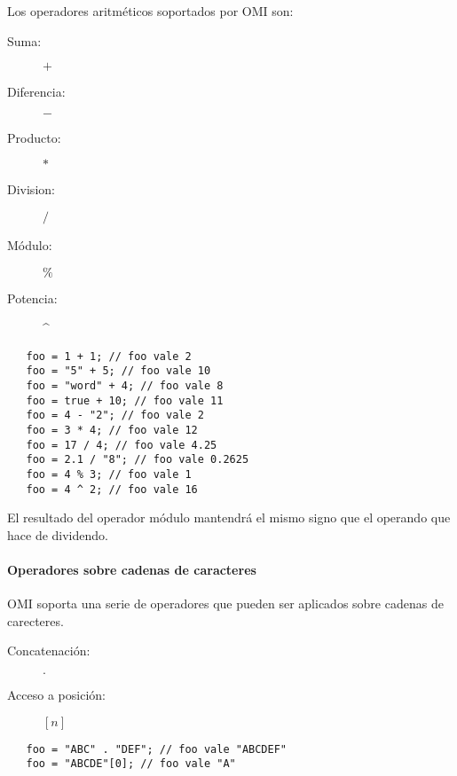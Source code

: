 Los operadores aritméticos soportados por OMI son:

\begin{description}
\item [Suma:] $+$
\item [Diferencia:] $-$
\item [Producto:] $*$
\item [Division:] $/$
\item [Módulo:] $\%$
\item [Potencia:] \^ \hfill   
\end{description} 


\begin{lstlisting}
   foo = 1 + 1; // foo vale 2
   foo = "5" + 5; // foo vale 10
   foo = "word" + 4; // foo vale 8
   foo = true + 10; // foo vale 11
   foo = 4 - "2"; // foo vale 2
   foo = 3 * 4; // foo vale 12
   foo = 17 / 4; // foo vale 4.25
   foo = 2.1 / "8"; // foo vale 0.2625
   foo = 4 % 3; // foo vale 1
   foo = 4 ^ 2; // foo vale 16 
\end{lstlisting} 

El resultado del operador módulo mantendrá el mismo signo que el operando que hace de dividendo.




\paragraph{Operadores sobre cadenas de caracteres}\label{sec:op_string}
OMI soporta una serie de operadores que pueden ser aplicados sobre cadenas de carecteres. 

\begin{description}
\item [Concatenación:] $.$
\item [Acceso a posición:] $[n]$
\end{description} 

\begin{lstlisting}
   foo = "ABC" . "DEF"; // foo vale "ABCDEF"
   foo = "ABCDE"[0]; // foo vale "A"
\end{lstlisting} 

